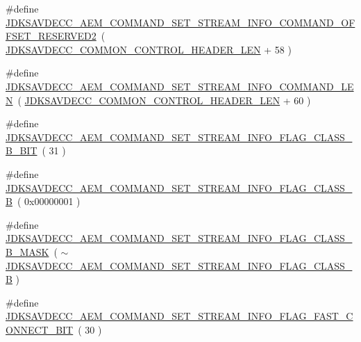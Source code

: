 \begin{DoxyCompactItemize}
\item 
\#define \hyperlink{group__command__set__stream__info_ga527d4f608fbf2d2adfd8d3e43d219108}{J\+D\+K\+S\+A\+V\+D\+E\+C\+C\+\_\+\+A\+E\+M\+\_\+\+C\+O\+M\+M\+A\+N\+D\+\_\+\+S\+E\+T\+\_\+\+S\+T\+R\+E\+A\+M\+\_\+\+I\+N\+F\+O\+\_\+\+C\+O\+M\+M\+A\+N\+D\+\_\+\+O\+F\+F\+S\+E\+T\+\_\+\+R\+E\+S\+E\+R\+V\+E\+D2}~( \hyperlink{group__jdksavdecc__avtp__common__control__header_gaae84052886fb1bb42f3bc5f85b741dff}{J\+D\+K\+S\+A\+V\+D\+E\+C\+C\+\_\+\+C\+O\+M\+M\+O\+N\+\_\+\+C\+O\+N\+T\+R\+O\+L\+\_\+\+H\+E\+A\+D\+E\+R\+\_\+\+L\+EN} + 58 )
\item 
\#define \hyperlink{group__command__set__stream__info_ga07fbd87fc77d6b4b2bd0b4e05900729d}{J\+D\+K\+S\+A\+V\+D\+E\+C\+C\+\_\+\+A\+E\+M\+\_\+\+C\+O\+M\+M\+A\+N\+D\+\_\+\+S\+E\+T\+\_\+\+S\+T\+R\+E\+A\+M\+\_\+\+I\+N\+F\+O\+\_\+\+C\+O\+M\+M\+A\+N\+D\+\_\+\+L\+EN}~( \hyperlink{group__jdksavdecc__avtp__common__control__header_gaae84052886fb1bb42f3bc5f85b741dff}{J\+D\+K\+S\+A\+V\+D\+E\+C\+C\+\_\+\+C\+O\+M\+M\+O\+N\+\_\+\+C\+O\+N\+T\+R\+O\+L\+\_\+\+H\+E\+A\+D\+E\+R\+\_\+\+L\+EN} + 60 )
\item 
\#define \hyperlink{group__command__set__stream__info_gad7e8de153ef36f22ff507170b746bd91}{J\+D\+K\+S\+A\+V\+D\+E\+C\+C\+\_\+\+A\+E\+M\+\_\+\+C\+O\+M\+M\+A\+N\+D\+\_\+\+S\+E\+T\+\_\+\+S\+T\+R\+E\+A\+M\+\_\+\+I\+N\+F\+O\+\_\+\+F\+L\+A\+G\+\_\+\+C\+L\+A\+S\+S\+\_\+\+B\+\_\+\+B\+IT}~( 31 )
\item 
\#define \hyperlink{group__command__set__stream__info_ga73b2abb5893265dada589e4d0e2b7875}{J\+D\+K\+S\+A\+V\+D\+E\+C\+C\+\_\+\+A\+E\+M\+\_\+\+C\+O\+M\+M\+A\+N\+D\+\_\+\+S\+E\+T\+\_\+\+S\+T\+R\+E\+A\+M\+\_\+\+I\+N\+F\+O\+\_\+\+F\+L\+A\+G\+\_\+\+C\+L\+A\+S\+S\+\_\+B}~( 0x00000001 )
\item 
\#define \hyperlink{group__command__set__stream__info_gafe4a878606a7e58d26c9926f8cc67b81}{J\+D\+K\+S\+A\+V\+D\+E\+C\+C\+\_\+\+A\+E\+M\+\_\+\+C\+O\+M\+M\+A\+N\+D\+\_\+\+S\+E\+T\+\_\+\+S\+T\+R\+E\+A\+M\+\_\+\+I\+N\+F\+O\+\_\+\+F\+L\+A\+G\+\_\+\+C\+L\+A\+S\+S\+\_\+\+B\+\_\+\+M\+A\+SK}~( $\sim$\hyperlink{group__command__set__stream__info_ga73b2abb5893265dada589e4d0e2b7875}{J\+D\+K\+S\+A\+V\+D\+E\+C\+C\+\_\+\+A\+E\+M\+\_\+\+C\+O\+M\+M\+A\+N\+D\+\_\+\+S\+E\+T\+\_\+\+S\+T\+R\+E\+A\+M\+\_\+\+I\+N\+F\+O\+\_\+\+F\+L\+A\+G\+\_\+\+C\+L\+A\+S\+S\+\_\+B} )
\item 
\#define \hyperlink{group__command__set__stream__info_gac3e6a9899303f3c5e38b93797c7445d6}{J\+D\+K\+S\+A\+V\+D\+E\+C\+C\+\_\+\+A\+E\+M\+\_\+\+C\+O\+M\+M\+A\+N\+D\+\_\+\+S\+E\+T\+\_\+\+S\+T\+R\+E\+A\+M\+\_\+\+I\+N\+F\+O\+\_\+\+F\+L\+A\+G\+\_\+\+F\+A\+S\+T\+\_\+\+C\+O\+N\+N\+E\+C\+T\+\_\+\+B\+IT}~( 30 )

\end{DoxyCompactItemize}
